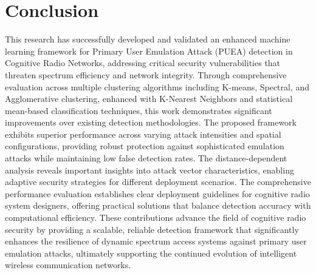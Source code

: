 \chapter{Conclusion}
\label{Chapter6}

This research has successfully developed and validated an enhanced machine learning framework for Primary User Emulation Attack (PUEA) detection in Cognitive Radio Networks, addressing critical security vulnerabilities that threaten spectrum efficiency and network integrity. Through comprehensive evaluation across multiple clustering algorithms including K-means, Spectral, and Agglomerative clustering, enhanced with K-Nearest Neighbors and statistical mean-based classification techniques, this work demonstrates significant improvements over existing detection methodologies. The proposed framework exhibits superior performance across varying attack intensities and spatial configurations, providing robust protection against sophisticated emulation attacks while maintaining low false detection rates. The distance-dependent analysis reveals important insights into attack vector characteristics, enabling adaptive security strategies for different deployment scenarios. The comprehensive performance evaluation establishes clear deployment guidelines for cognitive radio system designers, offering practical solutions that balance detection accuracy with computational efficiency. These contributions advance the field of cognitive radio security by providing a scalable, reliable detection framework that significantly enhances the resilience of dynamic spectrum access systems against primary user emulation attacks, ultimately supporting the continued evolution of intelligent wireless communication networks.
